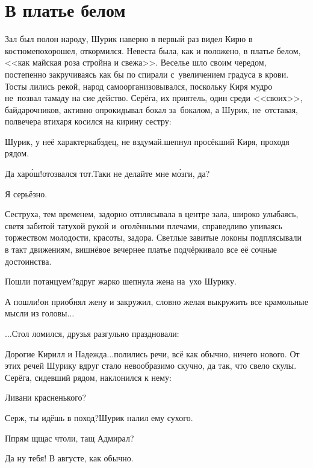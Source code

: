 {
\chapter{В платье белом}
\vepsianrose

\fancyhead[LE]{\fancyplain{}{\bfseries \parttitle}}
\fancyhead[RO]{\fancyplain{}{\bfseries \rightmark}}

Зал был полон народу, Шурик наверно в первый раз видел Кирю в костюме\mdash похорошел, откормился. Невеста была, как и положено, в платье белом, <<как майская роза стройна и свежа>>. Веселье шло своим чередом, постепенно закручиваясь как бы по спирали с~увеличением градуса в крови. Тосты лились рекой, народ самоорганизовывался, поскольку Киря мудро не~позвал тамаду на сие действо. Серёга, их приятель, один среди <<своих>>, байдарочников, активно опрокидывал бокал за~бокалом, а Шурик, не~отставая, полвечера втихаря косился на кирину сестру:

\diagdash Шурик, у неё характер\mdash кабздец, не вздумай.\mdash шепнул просёкший Киря, проходя рядом. 

\diagdash Да хар\'{о}ш!\mdash отозвался тот.\mdash Таки не делайте мне м\'{о}зги, да?

\diagdash Я серьёзно.

Сеструха, тем временем, задорно отплясывала в центре зала, широко улыбаясь, светя забитой татухой рукой и~оголёнными плечами, справедливо упиваясь торжеством молодости, красоты, задора. Светлые завитые локоны подплясывали в такт движениям, вишнёвое вечернее платье подчёркивало все её сочные достоинства.

\diagdash Пошли потанцуем?\mdash вдруг жарко шепнула жена на~ухо Шурику.

\diagdash А пошли!\mdash он приобнял жену и закружил, словно желая выкружить все крамольные мысли из головы$\ldots$

$\ldots$Стол ломился, друзья разгульно праздновали:

\diagdash Дорогие Кирилл и Надежда$\ldots$\mdash полились речи, всё как обычно, ничего нового. От этих речей Шурику вдруг стало невообразимо скучно, да так, что свело скулы. Серёга, сидевший рядом, наклонился к нему:

\diagdash Ливани красненького?

\diagdash Серж, ты идёшь в поход?\mdash Шурик налил ему сухого. 

\diagdash П\sdash прям щ\sdash щас чтоли, тащ Адмирал?

\diagdash Да ну тебя! В августе, как обычно.

}
